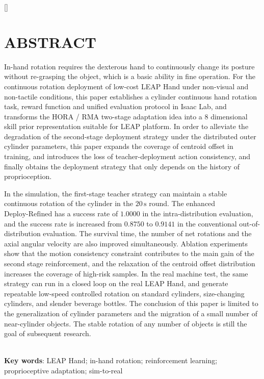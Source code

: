 
[]

\section*{ABSTRACT}
\thesisbodyfont
In-hand rotation requires the dexterous hand to continuously change its posture without re-grasping the object, which is a basic ability in fine operation. For the continuous rotation deployment of low-cost LEAP Hand under non-visual and non-tactile conditions, this paper establishes a cylinder continuous hand rotation task, reward function and unified evaluation protocol in Isaac Lab, and transforms the HORA / RMA two-stage adaptation idea into a \(8\) dimensional skill prior representation suitable for LEAP platform. In order to alleviate the degradation of the second-stage deployment strategy under the distributed outer cylinder parameters, this paper expands the coverage of centroid offset in training, and introduces the loss of teacher-deployment action consistency, and finally obtains the deployment strategy that only depends on the history of proprioception.\par
In the simulation, the first-stage teacher strategy can maintain a stable continuous rotation of the cylinder in the \(20\,\mathrm{s}\) round. The enhanced \(\mathrm{Deploy\text{-}Refined}\) has a success rate of \(1.0000\) in the intra-distribution evaluation, and the success rate is increased from \(0.8750\) to \(0.9141\) in the conventional out-of-distribution evaluation. The survival time, the number of net rotations and the axial angular velocity are also improved simultaneously. Ablation experiments show that the motion consistency constraint contributes to the main gain of the second stage reinforcement, and the relaxation of the centroid offset distribution increases the coverage of high-risk samples. In the real machine test, the same strategy can run in a closed loop on the real LEAP Hand, and generate repeatable low-speed controlled rotation on standard cylinders, size-changing cylinders, and slender beverage bottles. The conclusion of this paper is limited to the generalization of cylinder parameters and the migration of a small number of near-cylinder objects. The stable rotation of any number of objects is still the goal of subsequent research.\par
~\\
\hspace*{2em}\textbf{Key words}: LEAP Hand; in-hand rotation; reinforcement learning; proprioceptive adaptation; sim-to-real\\
